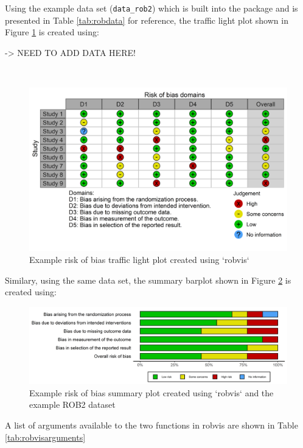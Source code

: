 \documentclass[a4paper, twoside]{templates/ociamthesis}
\begin{document}
Using the example data set (\texttt{data\_rob2}) which is built into the package and is presented in Table \ref{tab:robdata} for reference, the traffic light plot shown in Figure \ref{fig:trafficplot} is created using:

-\textgreater{} NEED TO ADD DATA HERE!

~

\begin{figure}
\includegraphics[width=1\linewidth]{figures/sys-rev-tools/example-rob-traffic-light-plot} \caption{Example risk of bias traffic light plot created using `robvis`}\label{fig:trafficplot}
\end{figure}

Similary, using the same data set, the summary barplot shown in Figure \ref{fig:summaryplot} is created using:

\begin{figure}
\includegraphics[width=1\linewidth]{figures/sys-rev-tools/example-rob-summary-barplot} \caption{Example risk of bias summary plot created using `robvis` and the example ROB2 dataset}\label{fig:summaryplot}
\end{figure}

A list of arguments available to the two functions in robvis are shown in Table \ref{tab:robvisarguments}

\begingroup\fontsize{9}{11}\selectfont
\end{document}
